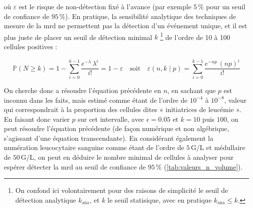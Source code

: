 où $\varepsilon$ est le risque de non-détection fixé à l'avance (par exemple $5\,\%$ pour un seuil de confiance de $95\,\%$).
En pratique, la sensibilité analytique des techniques de mesure de la \gls{mrd} ne permettent pas la détection d'un événement unique, et il est plus juste de placer 
un seuil de détection minimal $k$ \footnote{On confond ici volontairement pour des raisons de simplicité le seuil de détection analytique $k_{\text{ana}}$, 
et $k$ le seuil statisique, avec en pratique $k_{\text{ana}} \leq k$.} de l'ordre de 10 à 100 cellules positives : 

\begin{equation}
    \mathbb{P}(N \geq k) = 1 - \sum_{i = 0}^{k-1} \frac{e^{-\lambda} \, \lambda^{i}}{i!} = 1 - \varepsilon
    \quad \text{soit} \quad \varepsilon(n,k \mid p) = \sum_{i = 0}^{k-1} \frac{e^{-np} \, (np)^{i}}{i!}
\end{equation}

On cherche donc a résoudre l'équation précédente en $n$, en sachant que $p$ est inconnu dans les faits, mais estimé comme étant de l'ordre de $10^{-4}$ à $10^{-8}$, 
valeur qui correspondrait à la proportion des cellules dites « initiatrices de leucémie ». En faisant donc varier $p$ sur cet intervalle, avec $\epsilon = 0.05$ et 
$k = 10$ puis $100$, on peut résoudre l'équation précédente (de façon numérique et non algébrique, s'agissant d'une équation transcendante). En considérant également 
la numération leucocytaire sanguine comme étant de l'ordre de $5\,\text{G/L}$ et médullaire de $50\,\text{G/L}$, on peut en déduire le nombre minimal de cellules à analyser 
pour espérer détecter la \gls{mrd} au seuil de confiance de $95\,\%$ (\autoref{tab:valeurs_n_volume}).

